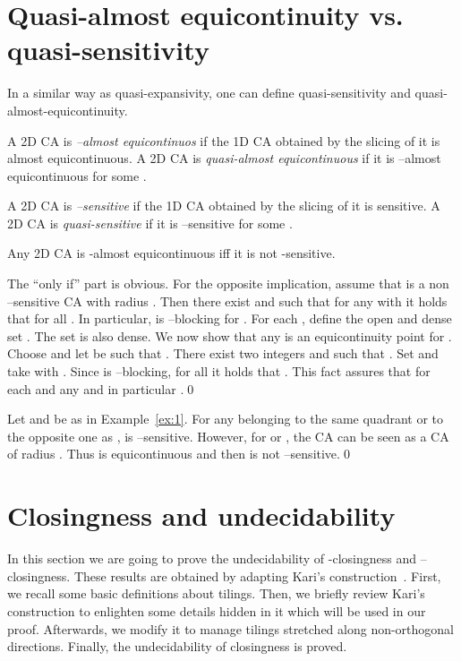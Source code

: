 \documentclass{llncs}
\begin{document}
\section{Quasi-almost equicontinuity vs. quasi-sensitivity}
In a similar way as quasi-expansivity, one can define quasi-sensitivity
and quasi-almost-equi\-conti\-nui\-ty.
\begin{definition}
\label{def:almostlike} A 2D CA  is \emph{--almost
e\-qui\-con\-ti\-nuos} if the 1D CA  obtained by
the  slicing of it is almost equicontinuous. A 2D CA  is
\emph{quasi-almost equicontinuous} if it is --almost
equicontinuous for some .
\end{definition}
\begin{definition}
\label{def:senslike} A 2D CA  is \emph{--sensitive} if the
1D CA  obtained by the  slicing of it
is sensitive. A 2D CA  is \emph{quasi-sensitive} if it is
--sensitive for some .
\end{definition}
\begin{proposition}\label{prop:quasisens}
Any 2D CA  is -almost equicontinuous iff it is not
-sensitive.
\end{proposition}
\proof
The ``only if'' part is obvious. For the opposite implication,
assume that  is a non --sensitive CA with radius .
Then there exist  and  such that for any
 with  it
holds that  for all
. In particular,  is --blocking for
. For each , define the open and dense set
. The set
 is also dense. We now show that any
 is an equicontinuity point for . Choose
 and let  be such that
. There exist two integers  and  such that .
Set  and take 
with . Since  is --blocking, for all
 it holds that
. This
fact assures that for each  and any
  and in particular
.\qed


\begin{example}
Let  and  be as in Example~\ref{ex:1}. For any  belonging
to the same quadrant or to the opposite one as ,  is --sensitive. However, for
 or , the CA  can be seen as a CA of
radius . Thus  is equicontinuous and then  is not
--sensitive.\qed
\end{example}

\section{Closingness and undecidability}\label{sec:closund}


In this section we are going to prove the undecidability of -closingness and --closingness. These
results are obtained by adapting Kari's construction~\cite{kari94a}. First, we recall some basic definitions about tilings. Then, 
we briefly review Kari's construction to enlighten some details hidden in it which will be used in our proof. Afterwards, we modify it
to manage tilings stretched along non-orthogonal directions. Finally, the undecidability of closingness is proved.
\end{document}
